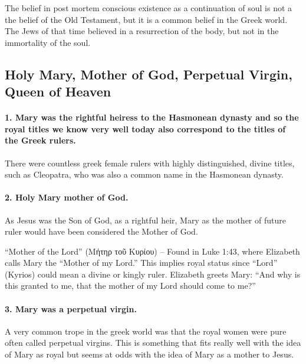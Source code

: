 The belief in post mortem conscious existence as a continuation of soul is not a the belief of the Old Testament, but it is a common belief in the Greek world.
The Jews of that time believed in a resurrection of the body, but not in the immortality of the soul.

\subsection{Holy Mary, Mother of God, Perpetual Virgin, Queen of Heaven}\label{par:sec:holy-mary-mother-of-god-perpetual-virgin-queen-of-heaven}

\paragraph{1.
Mary was the rightful heiress to the Hasmonean dynasty and so the royal titles we know very well today also correspond to the titles of the Greek rulers.}\label{par:sec:mary-was-the-rightful-heiress-to-the-hasmonean-dynasty-and-so-the-royal-titles-we-know-very-well-today-also-correspond-to-the-titles-of-the-greek-rulers.}

There were countless greek female rulers with highly distinguished, divine titles, such as Cleopatra, who was also a common name in the Hasmonean dynasty.

\paragraph{2.
Holy Mary mother of God.}\label{par:sec:holy-mary-mother-of-god.}

As Jesus was the Son of God, as a rightful heir, Mary as the mother of future ruler would have been considered the Mother of God.

``Mother of the Lord'' (Μήτηρ τοῦ Κυρίου) -- Found in Luke 1:43, where Elizabeth calls Mary the ``Mother of my Lord.'' This implies royal status since ``Lord'' (Kyrios) could mean a divine or kingly ruler.
Elizabeth greets Mary: ``And why is this granted to me, that the mother of my Lord should come to me?''

\paragraph{3.
Mary was a perpetual virgin.}\label{par:sec:mary-was-a-perpetual-virgin.}

A very common trope in the greek world was that the royal women were pure often called perpetual virgins.
This is something that fits really well with the idea of Mary as royal but seems at odds with the idea of Mary as a mother to Jesus.

